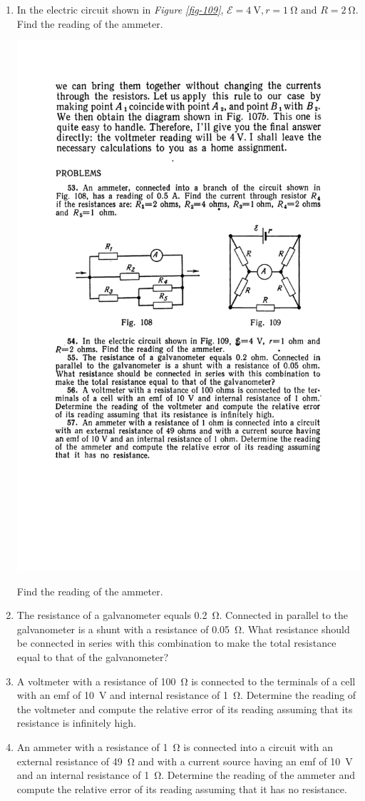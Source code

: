 \documentclass[a4paper,sfsidenotes]{tufte-book}
\newcommand{\Ea}{\mathcal{E}}
\begin{document}
\begin{enumerate}[resume=problems]
\item In the electric circuit shown in \emph{Figure \ref{fig-109}}, $\Ea=\SI{4}{\volt}, r= \SI{1}{\ohm} \,\, \text{and} \,\, R= \SI{2}{\ohm}$. Find the reading of the ammeter.
\begin{marginfigure}%
\centering
\includegraphics[width=0.7\linewidth]{fig-109a}
\caption{Find the reading of the ammeter.}
\label{fig-109}
\end{marginfigure}

\item The resistance of a galvanometer equals \SI{0.2}{\ohm}. Connected in parallel to the galvanometer is a shunt with a resistance of \SI{0.05}{\ohm}. What resistance should be connected in series with this combination to make the total resistance equal to that of the galvanometer?
\item A voltmeter with a resistance of \SI{100}{\ohm} is connected to the terminals of a cell with an emf of \SI{10}{\volt} and internal resistance of \SI{1}{\ohm}. Determine the reading of the voltmeter and compute the relative error of its reading assuming that its resistance is infinitely high.
\item An ammeter with a resistance of \SI{1}{\ohm} is connected into a circuit with an external resistance of \SI{49}{\ohm} and with a current source having an emf of \SI{10}{\volt} and an internal resistance of \SI{1}{\ohm}. Determine the reading of the ammeter and compute the relative error of its reading assuming that it has no resistance.
\end{enumerate}
\end{document}

